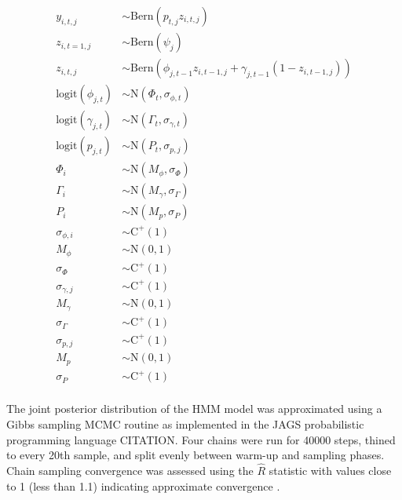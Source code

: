 \documentclass[12pt,letterpaper]{article}
\begin{document}
\begin{equation}
  \begin{aligned}
    y_{i, t, j} &\sim \mathrm{Bern}(p_{t, j} z_{i, t, j}) \\
    z_{i, t = 1, j} &\sim \mathrm{Bern}(\psi_{j}) \\
    z_{i, t, j} &\sim \mathrm{Bern}(\phi_{j, t - 1} z_{i, t - 1, j} + \gamma_{j, t - 1} (1 - z_{i, t - 1, j})) \\
    \mathrm{logit}(\phi_{j, t}) &\sim \mathrm{N}(\Phi_{t}, \sigma_{\phi, t}) \\
    \mathrm{logit}(\gamma_{j, t}) &\sim \mathrm{N}(\Gamma_{t}, \sigma_{\gamma, t}) \\
    \mathrm{logit}(p_{j, t}) &\sim \mathrm{N}(P_{t}, \sigma_{p, j}) \\
    \Phi_{i} &\sim \mathrm{N}(M_{\phi}, \sigma_{\Phi}) \\
    \Gamma_{i} &\sim \mathrm{N}(M_{\gamma}, \sigma_{\Gamma}) \\
    P_{i} &\sim \mathrm{N}(M_{p}, \sigma_{P}) \\
    \sigma_{\phi, i} &\sim \mathrm{C}^{+}(1) \\
    M_{\phi} &\sim \mathrm{N}(0, 1) \\
    \sigma_{\Phi} &\sim \mathrm{C}^{+}(1) \\
    \sigma_{\gamma, j} &\sim \mathrm{C}^{+}(1) \\
    M_{\gamma} &\sim \mathrm{N}(0, 1) \\
    \sigma_{\Gamma} &\sim \mathrm{C}^{+}(1) \\
    \sigma_{p, j} &\sim \mathrm{C}^{+}(1) \\
    M_{p} &\sim \mathrm{N}(0, 1) \\
    \sigma_{P} &\sim \mathrm{C}^{+}(1) \\
  \end{aligned}
\end{equation}

The joint posterior distribution of the HMM model was approximated using a Gibbs sampling MCMC routine as implemented in the JAGS probabilistic programming language CITATION. Four chains were run for 40000 steps, thined to every 20th sample, and split evenly between warm-up and sampling phases. Chain sampling convergence was assessed using the \(\hat{R}\) statistic with values close to 1 (less than 1.1) indicating approximate convergence \citep{Gelman2013d}.

\end{document}
